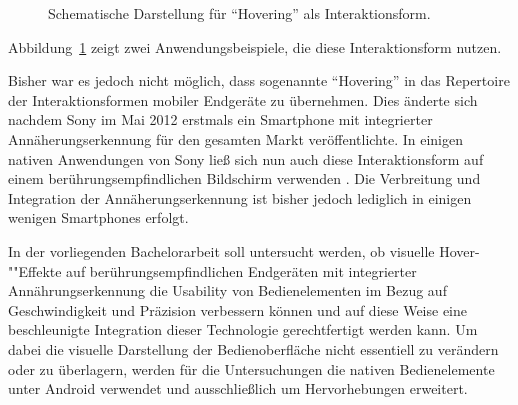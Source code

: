 \documentclass[12pt,numbers=noenddot,parskip,bibliography=totocnumbered,listof=totocnumbered]{scrreprt}
\begin{document}
\begin{figure}
\centering
{}
\hfill
{}
\caption{Schematische Darstellung für "`Hovering"' als Interaktionsform.}
\label{hoveringdesktop}
\end{figure}
Abbildung~\ref{hoveringdesktop} zeigt zwei Anwendungsbeispiele, die diese Interaktionsform nutzen.

Bisher war es jedoch nicht möglich, dass sogenannte "`Hovering"' in das Repertoire der Interaktionsformen mobiler Endgeräte zu übernehmen. Dies änderte sich nachdem Sony im Mai 2012 erstmals ein Smartphone mit integrierter Annäherungserkennung für den gesamten Markt veröffentlichte. In einigen nativen Anwendungen von Sony ließ sich nun auch diese Interaktionsform auf einem berührungsempfindlichen Bildschirm verwenden \citep{sonyverge}. Die Verbreitung und Integration der Annäherungserkennung ist bisher jedoch lediglich in einigen wenigen Smartphones erfolgt.

In der vorliegenden Bachelorarbeit soll untersucht werden, ob visuelle Hover-""Effekte auf berührungsempfindlichen Endgeräten mit integrierter Annährungserkennung die Usability von Bedienelementen im Bezug auf Geschwindigkeit und Präzision verbessern können und auf diese Weise eine beschleunigte Integration dieser Technologie gerechtfertigt werden kann. Um dabei die visuelle Darstellung der Bedienoberfläche nicht essentiell zu verändern oder zu überlagern, werden für die Untersuchungen die nativen Bedienelemente unter Android verwendet und ausschließlich um Hervorhebungen erweitert.
\end{document}
